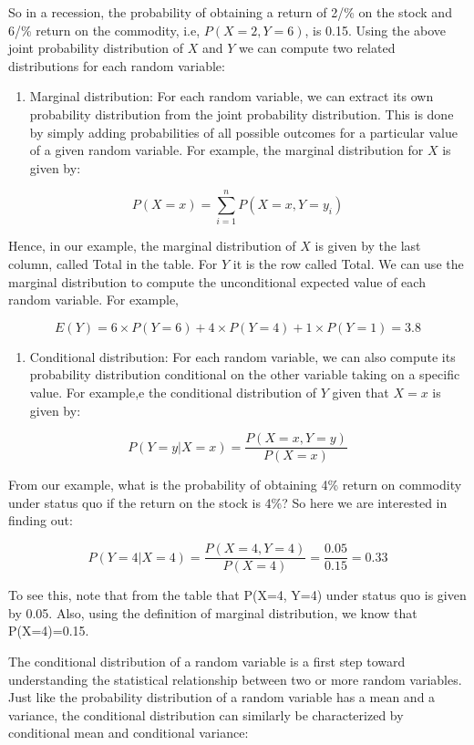 \documentclass[
]{book}
\providecommand{\tightlist}{%
  \setlength{\itemsep}{0pt}\setlength{\parskip}{0pt}}
\theoremstyle{definition}
\theoremstyle{definition}
\theoremstyle{definition}
\theoremstyle{definition}
\theoremstyle{remark}
\begin{document}
So in a recession, the probability of obtaining a return of 2/\% on the stock and 6/\% return on the commodity, i.e, \(P(X=2,Y=6)\), is 0.15.
Using the above joint probability distribution of \(X\) and \(Y\) we can compute two related distributions for each random variable:

\begin{enumerate}
\def\labelenumi{\arabic{enumi}.}
\tightlist
\item
  Marginal distribution: For each random variable, we can extract its own probability distribution from the joint probability distribution. This is done by simply adding probabilities of all possible outcomes for a particular value of a given random variable. For example, the marginal distribution for \(X\) is given by:
\end{enumerate}

\[P(X=x)=\sum_{i=1}^nP(X=x, Y=y_i)\]

Hence, in our example, the marginal distribution of \(X\) is given by the last column, called Total in the table. For \(Y\) it is the row called Total. We can use the marginal distribution to compute the unconditional expected value of each random variable. For example,

\[E(Y) = 6 \times P(Y=6) + 4 \times P(Y=4)+1 \times P(Y=1)=3.8\]

\begin{enumerate}
\def\labelenumi{\arabic{enumi}.}
\setcounter{enumi}{1}
\tightlist
\item
  Conditional distribution: For each random variable, we can also compute its probability distribution conditional on the other variable taking on a specific value. For example,e the conditional distribution of \(Y\) given that \(X=x\) is given by:
\end{enumerate}

\[ P(Y=y|X=x) =\frac{P(X=x,Y=y)}{P(X=x)}\]

From our example, what is the probability of obtaining 4\% return on commodity under status quo if the return on the stock is 4\%? So here we are interested in finding out:

\[ P(Y=4|X=4) =\frac{P(X=4,Y=4)}{P(X=4)}= \frac{0.05}{0.15}=0.33\]

To see this, note that from the table that P(X=4, Y=4) under status quo is given by 0.05. Also, using the definition of marginal distribution, we know that P(X=4)=0.15.

The conditional distribution of a random variable is a first step toward understanding the statistical relationship between two or more random variables. Just like the probability distribution of a random variable has a mean and a variance, the conditional distribution can similarly be characterized by conditional mean and conditional variance:
\end{document}
